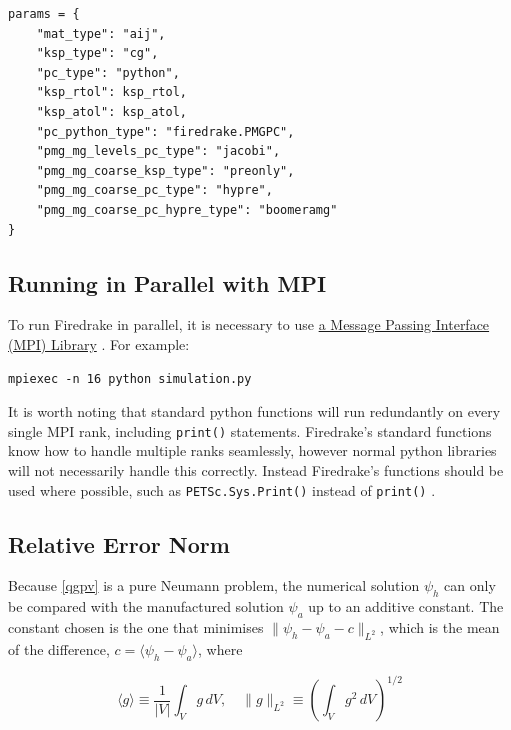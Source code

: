 \documentclass{article}
\begin{document}
\begin{appendices}
\begin{verbatim}
params = {
    "mat_type": "aij",
    "ksp_type": "cg",
    "pc_type": "python",
    "ksp_rtol": ksp_rtol,
    "ksp_atol": ksp_atol,
    "pc_python_type": "firedrake.PMGPC",
    "pmg_mg_levels_pc_type": "jacobi",
    "pmg_mg_coarse_ksp_type": "preonly",
    "pmg_mg_coarse_pc_type": "hypre",
    "pmg_mg_coarse_pc_hypre_type": "boomeramg"
}
\end{verbatim}

\subsection{Running in Parallel with MPI}\label{app:mpi}

To run Firedrake in parallel, it is necessary to use \href{https://www.firedrakeproject.org/parallelism.html}{a Message Passing Interface (MPI) Library} \cite{FiredrakeUserManual, Dalcin2011}.
For example:

\begin{verbatim}
mpiexec -n 16 python simulation.py
\end{verbatim}

It is worth noting that standard python functions will run redundantly on every single MPI rank, including \texttt{print()} statements.
Firedrake's standard functions know how to handle multiple ranks seamlessly, however normal python libraries will not necessarily handle this correctly.
Instead Firedrake's functions should be used where possible, such as \texttt{PETSc.Sys.Print()} instead of \texttt{print()} \cite{FiredrakeUserManual, Dalcin2011}.

\subsection{Relative Error Norm}\label{app:rel_error}

Because \cref{qgpv} is a pure Neumann problem, the numerical solution $\psi_h$ can only be compared with the manufactured solution $\psi_a$ up to an additive constant.
The constant chosen is the one that minimises $\lVert \psi_h - \psi_a - c \rVert_{L^2}$, which is the mean of the difference, $c = \langle \psi_h - \psi_a \rangle$, where

\begin{equation}
    \langle g \rangle \equiv \frac{1}{\lvert V\rvert} \int_V g \,dV, \quad \lVert g \rVert_{L^2} \equiv \left( \int_V g^2 \,dV \right)^{1/2}
\end{equation}


\end{appendices}
\end{document}
